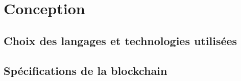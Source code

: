 \documentclass[../tb_report.tex]{subfiles}
\begin{document}
\chapter{Conception}
\label{ch:conception}

\section{Choix des langages et technologies utilisées}

\section{Spécifications de la blockchain}
\end{document}
